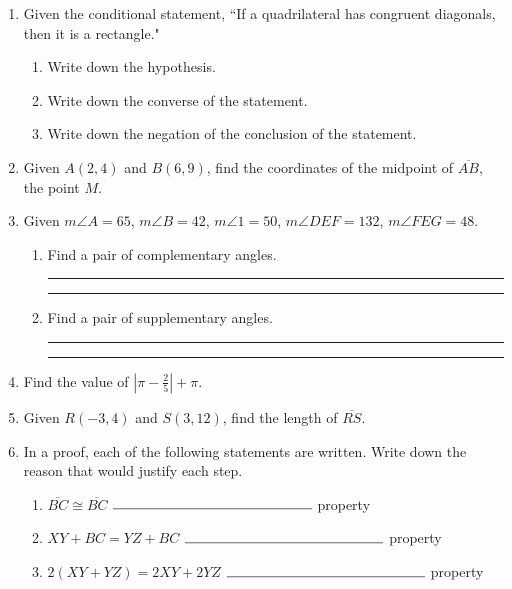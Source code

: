 \begin{enumerate}
\item Given the conditional statement, ``If a quadrilateral has congruent diagonals, then it is a rectangle."
  \begin{enumerate}
    \item Write down the hypothesis. \vspace{1.5cm}
    \item Write down the converse of the statement. \vspace{1.5cm}
    \item Write down the negation of the conclusion of the statement. \vspace{1.5cm}
  \end{enumerate}

\item Given $A(2,4)$ and $B(6,9)$, find the coordinates of the midpoint of $\overline{AB}$, the point $M$.
  \vspace{5cm}

\item Given $m \angle A=65$, $m \angle B=42$, $m \angle 1=50$, $m \angle DEF=132$, $m \angle FEG=48$. \bigskip
  \begin{enumerate}
    \item Find a pair of complementary angles. \rule{3cm}{0.15mm} \hspace{1cm} \rule{3cm}{0.15mm} \bigskip
    \item Find a pair of supplementary angles. \rule{3cm}{0.15mm} \hspace{1cm} \rule{3cm}{0.15mm} \bigskip
  \end{enumerate}

  \item Find the value of $|\pi-\frac{2}{5}|+\pi$. \vspace{2cm}

\newpage
\item Given $R(-3,4)$ and $S(3,12)$, find the length of $\overline{RS}$.
    \vspace{4cm}

\item In a proof, each of the following statements are written. Write down the reason that would justify each step. \bigskip
  \begin{enumerate}
    \item $\overline{BC} \cong \overline{BC}$ \hspace{4cm} $\rule{5cm}{0.15mm}$ property \bigskip
    \item $XY + BC= YZ+BC$  \hspace{1.7cm} $\rule{5cm}{0.15mm}$ property \bigskip
    \item $2(XY + YZ)=2XY+2YZ$  \hspace{0.8cm} $\rule{5cm}{0.15mm}$ property
  \end{enumerate} \bigskip


\end{enumerate}
